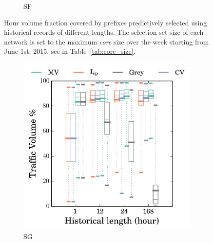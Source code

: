 \begin{figure}
\begin{subfigure}[b]{0.48\textwidth}
                \caption{SF}
                \label{fig:cvg_sf}
        \end{subfigure}
\caption{Hour volume fraction covered by prefixes predictively selected using historical records of different lengths. The selection set size of each network is set to the maximum \textit{core} size over the week starting from June 1st, 2015, see in Table~\ref{tab:core_size}.}
\label{fig:cvg}
\end{figure}

\begin{figure}\ContinuedFloat
        \begin{subfigure}[b]{0.48\textwidth}
                \includegraphics[width=\textwidth]{gfx/chap2/grey_cvg_box_method_compare_fs_sg.png}
                \caption{SG}
                \label{fig:cvg_sg}
        \end{subfigure}
        \begin{subfigure}[b]{0.48\textwidth}

\end{subfigure}
\end{figure}
